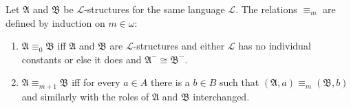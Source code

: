 Let $\mathfrak{A}$ and $\mathfrak{B}$ be $\mathcal{L}$-structures for the same language $\mathcal{L}$. The relations $\equiv_m$ are defined by induction on $m \in \omega$:

\begin{enumerate}
\item $\mathfrak{A} \equiv_0 \mathfrak{B}$ iff $\mathfrak{A}$ and $\mathfrak{B}$ are $\mathcal{L}$-structures and either $\mathcal{L}$ has no individual constants or else it does and $\mathfrak{A}^- \cong \mathfrak{B}^-$.
\item $\mathfrak{A} \equiv_{m+1} \mathfrak{B}$ iff for every $a \in A$ there is a $b \in B$ such that $(\mathfrak{A}, a) \equiv_m (\mathfrak{B}, b)$ and similarly with the roles of $\mathfrak{A}$ and $\mathfrak{B}$ interchanged.
\end{enumerate}
